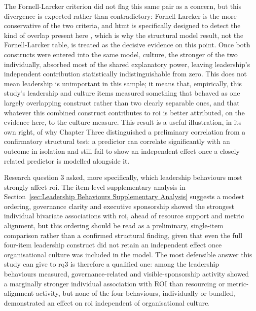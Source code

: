 The Fornell-Larcker criterion did not flag this same pair as a concern, but this divergence is expected rather than contradictory: Fornell-Larcker is the more conservative of the two criteria, and \gls{htmt} is specifically designed to detect the kind of overlap present here \autocite{Henseler2015}, which is why the structural model result, not the Fornell-Larcker table, is treated as the decisive evidence on this point. Once both constructs were entered into the same model, culture, the stronger of the two individually, absorbed most of the shared explanatory power, leaving leadership's independent contribution statistically indistinguishable from zero. This does not mean leadership is unimportant in this sample; it means that, empirically, this study's leadership and culture items measured something that behaved as one largely overlapping construct rather than two clearly separable ones, and that whatever this combined construct contributes to \gls{roi} is better attributed, on the evidence here, to the culture measure. This result is a useful illustration, in its own right, of why Chapter Three distinguished a preliminary correlation from a confirmatory structural test: a predictor can correlate significantly with an outcome in isolation and still fail to show an independent effect once a closely related predictor is modelled alongside it.

Research question 3 asked, more specifically, which leadership behaviours most strongly affect \gls{roi}. The item-level supplementary analysis in Section~\ref{sec:Leadership Behaviours Supplementary Analysis} suggests a modest ordering, governance clarity and executive sponsorship showed the strongest individual bivariate associations with \gls{roi}, ahead of resource support and metric alignment, but this ordering should be read as a preliminary, single-item comparison rather than a confirmed structural finding, given that even the full four-item leadership construct did not retain an independent effect once organisational culture was included in the model. The most defensible answer this study can give to \gls{rq3} is therefore a qualified one: among the leadership behaviours measured, governance-related and visible-sponsorship activity showed a marginally stronger individual association with ROI than resourcing or metric-alignment activity, but none of the four behaviours, individually or bundled, demonstrated an effect on \gls{roi} independent of organisational culture.

